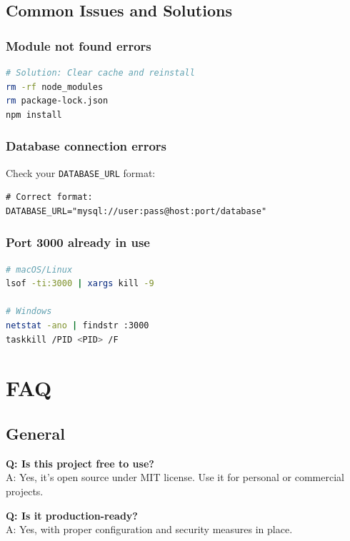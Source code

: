 \documentclass[12pt,a4paper]{article}
\begin{document}
\subsection{Common Issues and Solutions}

\subsubsection{Module not found errors}

\begin{lstlisting}[language=bash]
# Solution: Clear cache and reinstall
rm -rf node_modules
rm package-lock.json
npm install
\end{lstlisting}

\subsubsection{Database connection errors}

Check your \texttt{DATABASE\_URL} format:
\begin{lstlisting}
# Correct format:
DATABASE_URL="mysql://user:pass@host:port/database"
\end{lstlisting}

\subsubsection{Port 3000 already in use}

\begin{lstlisting}[language=bash]
# macOS/Linux
lsof -ti:3000 | xargs kill -9

# Windows
netstat -ano | findstr :3000
taskkill /PID <PID> /F
\end{lstlisting}

\section{FAQ}

\subsection{General}

\textbf{Q: Is this project free to use?} \\
A: Yes, it's open source under MIT license. Use it for personal or commercial projects.

\textbf{Q: Is it production-ready?} \\
A: Yes, with proper configuration and security measures in place.
\end{document}
